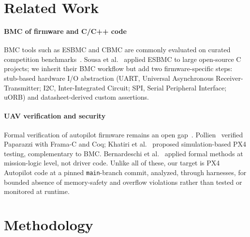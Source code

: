 \documentclass[conference]{IEEEtran}
\newcommand{\entra}[1]{#1}
\begin{document}
\section{Related Work}
\label{sec:related}

\paragraph{BMC of firmware and C/C++ code}
BMC tools such as ESBMC and CBMC are commonly evaluated on curated
competition benchmarks~\cite{Beyer2022}.
Sousa et al.~\cite{Sousa2026} applied ESBMC to large open-source C
projects; we inherit their BMC workflow but add two
firmware-specific steps: stub-based hardware I/O abstraction
(\entra{UART, Universal Asynchronous Receiver-Transmitter; I2C,
Inter-Integrated Circuit; SPI, Serial Peripheral Interface;} uORB)
and datasheet-derived custom assertions.

\paragraph{UAV verification and security}
Formal verification of autopilot firmware remains an open
gap~\cite{Luckcuck2019}.
Pollien~\cite{Pollien2023} verified Paparazzi with Frama-C and Coq;
Khatiri et al.~\cite{Khatiri2024}
proposed simulation-based PX4 testing, complementary to BMC.
Bernardeschi et al.~\cite{Bernardeschi2023} applied formal methods at
mission-logic level, not driver code. Unlike
all of these, our target is PX4 Autopilot code at a pinned \texttt{main}-branch commit, analyzed, through harnesses, for bounded absence of memory-safety and overflow
violations rather than tested or monitored at runtime.

\section{Methodology}
\label{sec:methodology}
\end{document}
